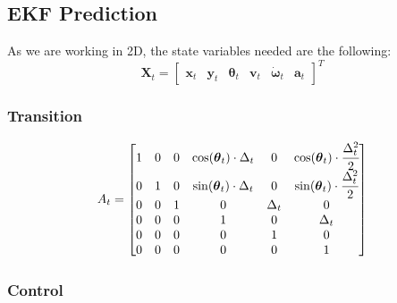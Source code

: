 \subsection{ \gls{EKF} Prediction}

\noindent 
As we are working in 2D, the state variables needed are the following:
$$
  \label{eq:state-transf}
\mathbf{X}_t=
\begin{bmatrix} 
\mathbf{x}_t & \mathbf{y}_t & \boldsymbol \theta_t & \mathbf{v}_t & \dot{\boldsymbol \omega}_t & \mathbf{a}_t 
\end{bmatrix} ^T
$$

\subsubsection{Transition}

\noindent 
\begin{equation}
A_t
=
\begin{bmatrix} 
1 & 0 & 0 & \cos(\boldsymbol \theta_t) \cdot \Delta_t & 0 & \cos(\boldsymbol \theta_t) \cdot  \cfrac{\Delta_t^2 }{2} \\ 
0 & 1 & 0 & \sin(\boldsymbol \theta_t) \cdot \Delta_t & 0 & \sin(\boldsymbol \theta_t) \cdot  \cfrac{\Delta_t^2 }{2} \\ 
0 & 0 & 1 & 0 & \Delta_t & 0 \\ 
0 & 0 & 0 & 1 & 0 & \Delta_t \\ 
0 & 0 & 0 & 0 & 1 & 0 \\ 
0 & 0 & 0 & 0 & 0 & 1 
\end{bmatrix}
\end{equation}


\subsubsection{Control}

